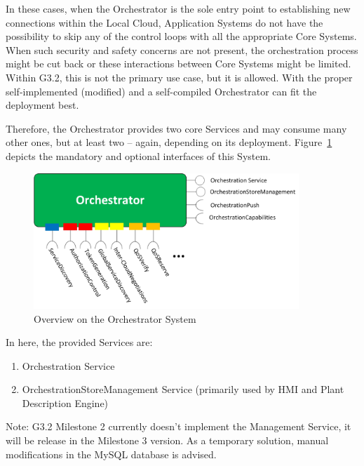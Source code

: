 \documentclass[a4paper]{arrowhead}
\begin{document}
In these cases, when the Orchestrator is the sole entry point to establishing new connections within the Local Cloud, Application Systems do not have the possibility to skip any of the control loops with all the appropriate Core Systems. When such security and safety concerns are not present, the orchestration process might be cut back or these interactions between Core Systems might be limited. Within G3.2, this is not the primary use case, but it is allowed. With the proper self-implemented (modified) and a self-compiled Orchestrator can fit the deployment best.

 
Therefore, the Orchestrator provides two core Services and may consume many other ones, but at least two -- again, depending on its deployment. Figure~\ref{fig:OrchSys} depicts the mandatory and optional interfaces of this System. 

\begin{figure}[h!]
	\centering
	\includegraphics[width=10cm]{fig/orch-sys.jpg}
	\caption{Overview on the Orchestrator System}
	\label{fig:OrchSys}
\end{figure}

In here, the provided Services are:
\begin{enumerate}
	\item Orchestration Service
	\item OrchestrationStoreManagement Service (primarily used by HMI and Plant Description Engine)
\end{enumerate}

Note: G3.2 Milestone 2 currently doesn't implement the Management Service, it will be release in the Milestone 3 version. As a temporary solution, manual modifications in the MySQL database is advised. 
\end{document}
